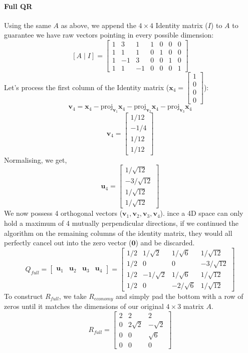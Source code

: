 \documentclass[../linear-algebra.tex]{subfiles}
\begin{document}
\paragraph{Full QR} Using the same $A$ as above, we append the $4 \times 4$ Identity matrix ($I$) to $A$ to guarantee we have raw vectors pointing in every possible dimension:
$$[A \mid I] = \begin{bmatrix} 1 & 3 & 1 & 1 & 0 & 0 & 0 \\ 1 & 1 & 1 & 0 & 1 & 0 & 0 \\ 1 & -1 & 3 & 0 & 0 & 1 & 0 \\ 1 & 1 & -1 & 0 & 0 & 0 & 1 \end{bmatrix}$$
Let's process the first column of the Identity matrix ($\mathbf{x}_4 = \begin{bmatrix} 1 \\ 0 \\ 0 \\ 0 \end{bmatrix}$):
$$\mathbf{v}_4 = \mathbf{x}_4 - \text{proj}_{\mathbf{v}_1}\mathbf{x}_4 - \text{proj}_{\mathbf{v}_2}\mathbf{x}_4 - \text{proj}_{\mathbf{v}_3}\mathbf{x}_4$$
$$\mathbf{v}_4 = \begin{bmatrix} 1/12 \\ -1/4 \\ 1/12 \\ 1/12 \end{bmatrix}$$
Normalising, we get,
$$\mathbf{u}_4 = \begin{bmatrix} 1/\sqrt{12} \\ -3/\sqrt{12} \\ 1/\sqrt{12} \\ 1/\sqrt{12} \end{bmatrix}$$
We now possess 4 orthogonal vectors ($\mathbf{v}_1, \mathbf{v}_2, \mathbf{v}_3, \mathbf{v}_4$). ince a 4D space can only hold a maximum of 4 mutually perpendicular directions, if we continued the algorithm on the remaining columns of the identity matrix, they would all perfectly cancel out into the zero vector ($\mathbf{0}$) and be discarded.
$$Q_{full} = \begin{bmatrix} \mathbf{u}_1 & \mathbf{u}_2 & \mathbf{u}_3 & \mathbf{u}_4 \end{bmatrix} = \begin{bmatrix} 1/2 & 1/\sqrt{2} & 1/\sqrt{6} & 1/\sqrt{12} \\ 1/2 & 0 & 0 & -3/\sqrt{12} \\ 1/2 & -1/\sqrt{2} & 1/\sqrt{6} & 1/\sqrt{12} \\ 1/2 & 0 & -2/\sqrt{6} & 1/\sqrt{12} \end{bmatrix}$$
To construct $R_{full}$, we take $R_{economy}$ and simply pad the bottom with a row of zeros until it matches the dimensions of our original $4 \times 3$ matrix $A$.
$$R_{full} = \begin{bmatrix} 2 & 2 & 2 \\ 0 & 2\sqrt{2} & -\sqrt{2} \\ 0 & 0 & \sqrt{6} \\ 0 & 0 & 0 \end{bmatrix}$$
\end{document}
